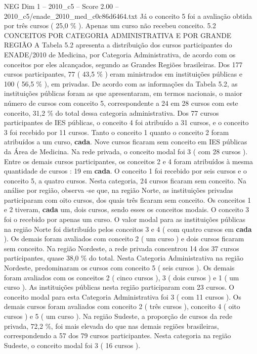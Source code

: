 \begin{textsample}{NEG Dim 1 – 2010\_c5 – Score 2.00 – 2010\_c5/enade\_2010\_med\_c0c86d6464.txt}
Já o conceito 5 foi a avaliação obtida por três cursos ( 25,0 \% ).
Apenas um curso não recebeu conceito. 5.2 CONCEITOS POR CATEGORIA ADMINISTRATIVA E POR GRANDE REGIÃO A Tabela 5.2 apresenta a distribuição dos cursos participantes do ENADE/2010 de Medicina, por Categoria Administrativa, de acordo com os conceitos por eles alcançados, segundo as Grandes Regiões brasileiras.
Dos 177 cursos participantes, 77 ( 43,5 \% ) eram ministrados em instituições públicas e 100 ( 56,5 \% ), em privadas.
De acordo com as informações da Tabela 5.2, as instituições públicas foram as que apresentaram, em termos nacionais, o maior número de cursos com conceito 5, correspondente a 24 em 28 cursos com este conceito, 31,2 \% do total dessa categoria administrativa.
Dos 77 cursos participantes de IES públicas, o conceito 4 foi atribuído a 31 cursos, e o conceito 3 foi recebido por 11 cursos.
Tanto o conceito 1 quanto o conceito 2 foram atribuídos a um curso, \textbf{cada}.
Nove cursos ficaram sem conceito em IES públicas da Área de Medicina.
Na rede privada, o conceito modal foi 3 ( com 28 cursos ).
Entre os demais cursos participantes, os conceitos 2 e 4 foram atribuídos à mesma quantidade de cursos : 19 em \textbf{cada}.
O conceito 1 foi recebido por seis cursos e o conceito 5, a quatro cursos.
Nesta categoria, 24 cursos ficaram sem conceito.
Na análise por região, observa -se que, na região Norte, as instituições privadas participaram com oito cursos, dos quais três ficaram sem conceito.
Os conceitos 1 e 2 tiveram, \textbf{cada} um, dois cursos, sendo esses os conceitos modais.
O conceito 3 foi o recebido por apenas um curso.
O valor modal para as instituições públicas na região Norte foi distribuído pelos conceitos 3 e 4 ( com quatro cursos em \textbf{cada} ).
Os demais foram avaliados com conceito 2 ( um curso ) e dois cursos ficaram sem conceito.
Na região Nordeste, a rede privada concentrou 14 dos 37 cursos participantes, quase 38,0 \% do total.
Nesta Categoria Administrativa na região Nordeste, predominaram os cursos com conceito 5 ( seis cursos ).
Os demais foram avaliados com os conceitos 2 ( cinco cursos ), 3 ( dois cursos ) e 1 ( um curso ).
As instituições públicas nesta região participaram com 23 cursos.
O conceito modal para esta Categoria Administrativa foi 3 ( com 11 cursos ).
Os demais cursos foram avaliados com conceito 2 ( três cursos ), conceito 4 ( oito cursos ) e 5 ( um curso ).
Na região Sudeste, a proporção de cursos da rede privada, 72,2 \%, foi mais elevada do que nas demais regiões brasileiras, correspondendo a 57 dos 79 cursos participantes.
Nesta categoria na região Sudeste, o conceito modal foi 3 ( 16 cursos ).

\end{textsample}
